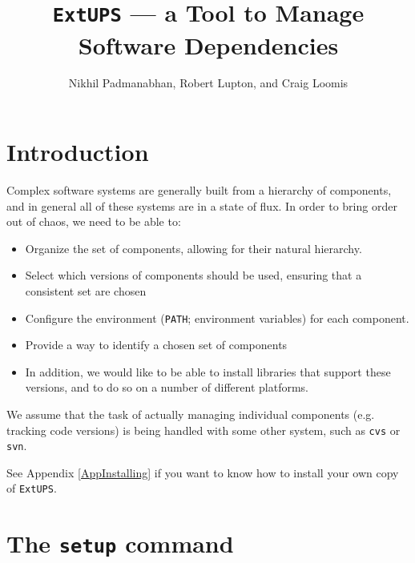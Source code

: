 \documentclass{article}
\newcommand{\code}[1]{\texttt{#1}}
\newcommand{\eups}{\code{ExtUPS}}
\begin{document}
\title{\eups{} --- a Tool to Manage Software Dependencies}
\author{Nikhil Padmanabhan, Robert Lupton, and Craig Loomis}

\maketitle

\tableofcontents
\newpage


\section{Introduction}

Complex software systems are generally built from a hierarchy of
components, and in general all of these systems are in a state of
flux.  In order to bring order out of chaos, we need to be able to:
\begin{itemize}
  \item Organize the set of components, allowing for their natural
    hierarchy.

  \item
    Select which versions of components should be used, ensuring
    that a consistent set are chosen

  \item
    Configure the environment (\code{PATH}; environment variables)
    for each component.

  \item
    Provide a way to identify a chosen set of components

  \item
    In addition, we would like to be able to install libraries that support
    these versions, and to do so on a number of different platforms.
\end{itemize}

We assume that the task of actually managing individual components
(e.g. tracking code versions) is being handled with some other system,
such as \code{cvs} or \code{svn}.

See Appendix \ref{AppInstalling} if you want to know how to install your own copy of \eups.

\section{The \code{setup} command}
\end{document}
